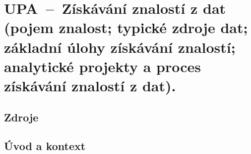 

\graphicspath{{upa/ziskavani_znalosti_z_dat/figures}}


\chapter{UPA~--~Získávání znalostí z dat (pojem znalost; typické zdroje dat; základní úlohy získávání znalostí; analytické projekty a proces získávání znalostí z dat).}


\section{Zdroje}

\begin{compactitem}
    \item {}
\end{compactitem}


\section{Úvod a kontext}

